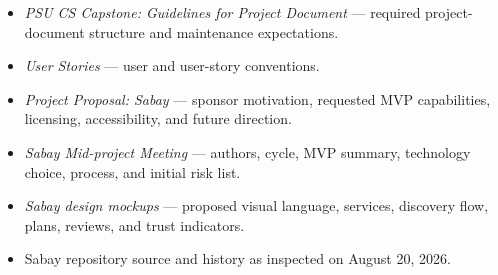\documentclass[11pt]{article}
\begin{document}
\begin{itemize}
  \item \emph{PSU CS Capstone: Guidelines for Project Document} --- required project-document structure and maintenance expectations.
  \item \emph{User Stories} --- user and user-story conventions.
  \item \emph{Project Proposal: Sabay} --- sponsor motivation, requested MVP capabilities, licensing, accessibility, and future direction.
  \item \emph{Sabay Mid-project Meeting} --- authors, cycle, MVP summary, technology choice, process, and initial risk list.
  \item \emph{Sabay design mockups} --- proposed visual language, services, discovery flow, plans, reviews, and trust indicators.
  \item Sabay repository source and history as inspected on August 20, 2026.
\end{itemize}
\end{document}
